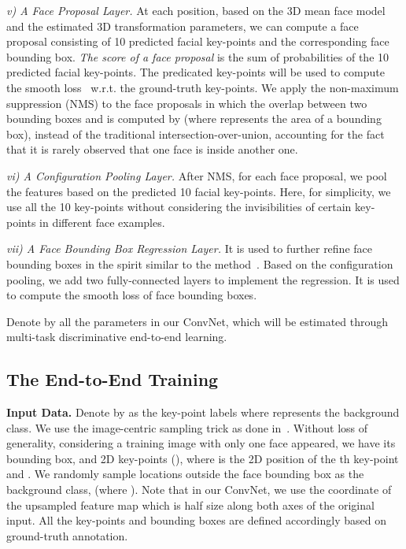 \documentclass[runningheads]{llncs}
\begin{document}
 \textit{v) A Face Proposal Layer.} At each position, based on the 3D mean face model and the estimated 3D transformation parameters, we can compute a face proposal consisting of 10 predicted facial key-points and the corresponding face bounding box. \textit{The score of a face proposal} is the sum of  probabilities of the 10 predicted facial key-points. The predicated key-points will be used to compute the smooth  loss~\cite{FastRCNN} w.r.t. the ground-truth key-points. We apply the non-maximum suppression (NMS) to the face proposals in which the overlap between two bounding boxes  and  is computed by  (where  represents the area of a bounding box), instead of the traditional intersection-over-union, accounting for the fact that it is rarely observed that one face is inside another one.

 \textit{vi) A Configuration Pooling Layer.} After NMS, for each face proposal, we pool the features based on the predicted 10 facial key-points. Here, for simplicity, we use all the 10 key-points without considering the invisibilities of certain key-points in different face examples.

\textit{vii) A Face Bounding Box Regression Layer.} It is used to further refine face bounding boxes in the spirit similar to the method~\cite{FastRCNN}. Based on the configuration pooling, we add two fully-connected layers to implement the regression. It is used to compute the smooth  loss of face bounding boxes.


Denote by  all the parameters in our ConvNet, which will be estimated through multi-task discriminative end-to-end learning.

\subsection{The End-to-End Training}\label{sec:training}
\textbf{Input Data.} Denote by  as the key-point labels where  represents the background class. We use the image-centric sampling trick as done in~\cite{FastRCNN,FasterRCNN}. Without loss of generality, considering a training image with only one face appeared, we have its bounding box,  and  2D key-points (),  where  is the 2D position of the th key-point and  . We randomly sample  locations outside the face bounding box  as the background class,  (where ). Note that in our ConvNet, we use the coordinate of the upsampled feature map which is half size along both axes of the original input. All the key-points and bounding boxes are defined accordingly based on ground-truth annotation.
\end{document}
